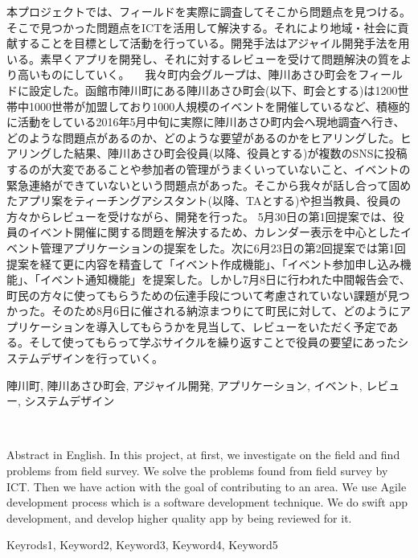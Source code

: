 \begin{jabstract}
本プロジェクトでは、フィールドを実際に調査してそこから問題点を見つける。そこで見つかった問題点をICTを活用して解決する。それにより地域・社会に貢献することを目標として活動を行っている。開発手法はアジャイル開発手法を用いる。素早くアプリを開発し、それに対するレビューを受けて問題解決の質をより高いものにしていく。
　我々町内会グループは、陣川あさひ町会をフィールドに設定した。函館市陣川町にある陣川あさひ町会(以下、町会とする)は1200世帯中1000世帯が加盟しており1000人規模のイベントを開催しているなど、積極的に活動をしている2016年5月中旬に実際に陣川あさひ町内会へ現地調査へ行き、どのような問題点があるのか、どのような要望があるのかをヒアリングした。ヒアリングした結果、陣川あさひ町会役員(以降、役員とする)が複数のSNSに投稿するのが大変であることや参加者の管理がうまくいっていないこと、イベントの緊急連絡ができていないという問題点があった。そこから我々が話し合って固めたアプリ案をティーチングアシスタント(以降、TAとする)や担当教員、役員の方々からレビューを受けながら、開発を行った。
5月30日の第1回提案では、役員のイベント開催に関する問題を解決するため、カレンダー表示を中心としたイベント管理アプリケーションの提案をした。次に6月23日の第2回提案では第1回提案を経て更に内容を精査して「イベント作成機能」、「イベント参加申し込み機能」、「イベント通知機能」を提案した。しかし7月8日に行われた中間報告会で、
町民の方々に使ってもらうための伝達手段について考慮されていない課題が見つかった。そのため8月6日に催される納涼まつりにて町民に対して、どのようにアプリケーションを導入してもらうかを見当して、レビューをいただく予定である。そして使ってもらって学ぶサイクルを繰り返すことで役員の要望にあったシステムデザインを行っていく。

\begin{jkeyword}
陣川町, 陣川あさひ町会, アジャイル開発, アプリケーション, イベント, レビュー, システムデザイン
\end{jkeyword}
\end{jabstract}
​
\begin{eabstract} Abstract in English.
In this project, at first, we investigate on the field and find problems from field survey. We solve the problems found from field survey by ICT. Then we have action with the goal of contributing to an area. We use Agile development process which is a software development technique. We do swift app development, and develop higher quality app by being reviewed for it.
\begin{ekeyword}
Keyrods1, Keyword2, Keyword3, Keyword4, Keyword5
\end{ekeyword}
\end{eabstract}
